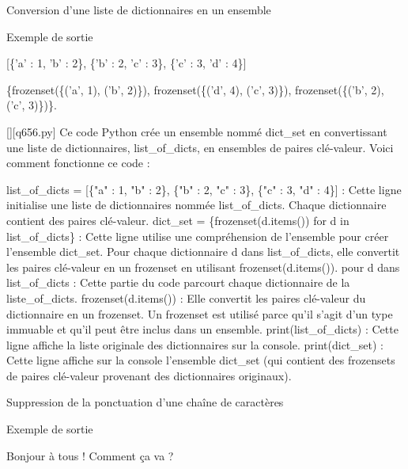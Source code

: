        \question
        Conversion d'une liste de dictionnaires en un ensemble

Exemple de sortie

[\{'a' : 1, 'b' : 2\}, \{'b' : 2, 'c' : 3\}, \{'c' : 3, 'd' : 4\}]

\{frozenset(\{('a', 1), ('b', 2)\}), frozenset(\{('d', 4), ('c', 3)\}), frozenset(\{('b', 2), ('c', 3)\})\}.
        \par
        \begin{solution}
            \renewcommand{\nomfichier}{q656.py}
            \pythonfile{\chemincode \nomfichier}[][\nomfichier]
            Ce code Python crée un ensemble nommé dict\_set en convertissant une liste de dictionnaires, list\_of\_dicts, en ensembles de paires clé-valeur. Voici comment fonctionne ce code :

    list\_of\_dicts = [\{"a" : 1, "b" : 2\}, \{"b" : 2, "c" : 3\}, \{"c" : 3, "d" : 4\}] : Cette ligne initialise une liste de dictionnaires nommée list\_of\_dicts. Chaque dictionnaire contient des paires clé-valeur.
    dict\_set = \{frozenset(d.items()) for d in list\_of\_dicts\} : Cette ligne utilise une compréhension de l'ensemble pour créer l'ensemble dict\_set. Pour chaque dictionnaire d dans list\_of\_dicts, elle convertit les paires clé-valeur en un frozenset en utilisant frozenset(d.items()).
        pour d dans list\_of\_dicts : Cette partie du code parcourt chaque dictionnaire de la liste\_of\_dicts.
        frozenset(d.items()) : Elle convertit les paires clé-valeur du dictionnaire en un frozenset. Un frozenset est utilisé parce qu'il s'agit d'un type immuable et qu'il peut être inclus dans un ensemble.
    print(list\_of\_dicts) : Cette ligne affiche la liste originale des dictionnaires sur la console.
    print(dict\_set) : Cette ligne affiche sur la console l'ensemble dict\_set (qui contient des frozensets de paires clé-valeur provenant des dictionnaires originaux).
        \end{solution}
        

        \question
        Suppression de la ponctuation d'une chaîne de caractères

Exemple de sortie

Bonjour à tous ! Comment ça va ?

